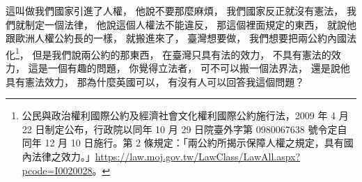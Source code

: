\hypertarget{w06:cue:752}{}這叫做我們國家引進了人權，
\hypertarget{w06:cue:753}{}他說不要那麼麻煩，
\hypertarget{w06:cue:754}{}我們國家反正就沒有憲法，
\hypertarget{w06:cue:755}{}我們就制定一個法律，
\hypertarget{w06:cue:756}{}他說這個人權法不能違反，
\hypertarget{w06:cue:757}{}那這個裡面規定的東西，
\hypertarget{w06:cue:758}{}就說他跟歐洲人權公約長的一樣，
\hypertarget{w06:cue:759}{}就搬進來了，
\hypertarget{w06:cue:760}{}臺灣想要做，
\hypertarget{w06:cue:761}{}我們想要把兩公約內國法化\footnote{公民與政治權利國際公約及經濟社會文化權利國際公約施行法，2009 年 4 月 22 日制定公布，行政院以同年 10 月 29 日院臺外字第 0980067638 號令定自同年 12 月 10 日施行。第 2 條規定：「兩公約所揭示保障人權之規定，具有國內法律之效力。」\url{https://law.moj.gov.tw/LawClass/LawAll.aspx?pcode=I0020028}。}，
\hypertarget{w06:cue:762}{}但是我們說兩公約的那東西，
\hypertarget{w06:cue:763}{}在臺灣只具有法的效力，
\hypertarget{w06:cue:764}{}不具有憲法的效力，
\hypertarget{w06:cue:765}{}這是一個有趣的問題，
\hypertarget{w06:cue:766}{}你覺得立法者，
\hypertarget{w06:cue:767}{}可不可以搬一個法界法，
\hypertarget{w06:cue:768}{}還是說他具有憲法效力，
\hypertarget{w06:cue:769}{}那為什麼英國可以，
\hypertarget{w06:cue:770}{}有沒有人可以回答我這個問題？


